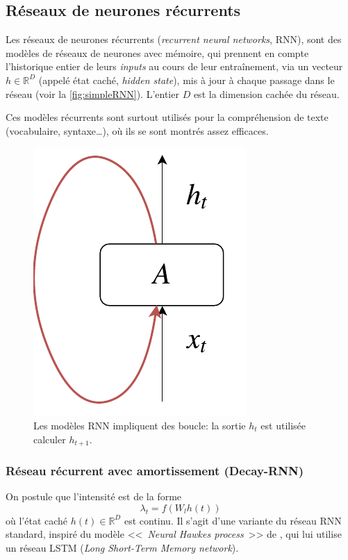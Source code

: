 \documentclass[11pt]{article}
\newcommand{\RR}{\mathbb{R}}
\begin{document}
\subsection{Réseaux de neurones récurrents}

Les réseaux de neurones récurrents (\textit{recurrent neural networks}, RNN), sont des modèles de réseaux de neurones avec mémoire, qui prennent en compte l'historique entier de leurs \textit{inputs} au cours de leur entraînement, via un vecteur $h\in\RR^D$ (appelé état caché, \textit{hidden state}), mis à jour à chaque passage dans le réseau (voir la \autoref{fig:simpleRNN}). L'entier $D$ est la dimension cachée du réseau.

Ces modèles récurrents sont surtout utilisés pour la compréhension de texte (vocabulaire, syntaxe\ldots), où ils se sont montrés assez efficaces. \cite{unreasonableEffectivenessRNN}

\begin{figure}
	\centering
	\includegraphics[height=0.2\textheight]{diagrams/rnn.pdf}
	\caption{Les modèles RNN impliquent des boucle: la sortie $h_t$ est utilisée calculer $h_{t+1}$.}\label{fig:simpleRNN}
\end{figure}

\subsubsection{Réseau récurrent avec amortissement (Decay-RNN)}

On postule que l'intensité est de la forme
\begin{equation}\label{eq:decayrnnhiddenstate}
	\lambda_t = f(W_l h(t))
\end{equation}
où l'état caché $h(t)\in\RR^D$ est continu. Il s'agit d'une variante du réseau RNN standard, inspiré du modèle <<~\textit{Neural Hawkes process}~>> de \citeauthor{meiEisnerNeuralHawkes} \cite{meiEisnerNeuralHawkes}, qui lui utilise un réseau LSTM (\textit{Long Short-Term Memory network}).
\end{document}
